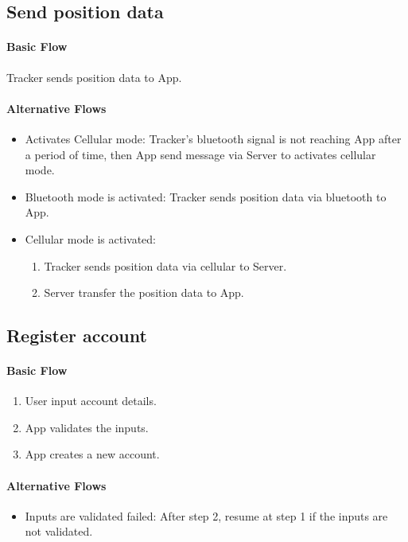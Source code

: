\documentclass[12pt,a4paper]{article}
\begin{document}
\begin{appendices}
        \subsection{Send position data}
        \paragraph{Basic Flow}
          Tracker sends position data to App.
        \paragraph{Alternative Flows}
          \begin{itemize}
            \item Activates Cellular mode: Tracker's bluetooth signal is not reaching App after a period of time, then App send message via Server to activates cellular mode.
            \item Bluetooth mode is activated: Tracker sends position data via bluetooth to App.
            \item Cellular mode is activated: 
            \begin{enumerate}
              \item Tracker sends position data via cellular to Server.
              \item Server transfer the position data to App.
            \end{enumerate}    
          \end{itemize}
      
      
      \subsection{Register account}
      \paragraph{Basic Flow}
        \begin{enumerate}
          \item User input account details.
          \item App validates the inputs.
          \item App creates a new account.
        \end{enumerate}
      \paragraph{Alternative Flows}
        \begin{itemize}
          \item Inputs are validated failed: After step 2, resume at step 1 if the inputs are not validated.
        \end{itemize}
      

\end{appendices}
\end{document}
